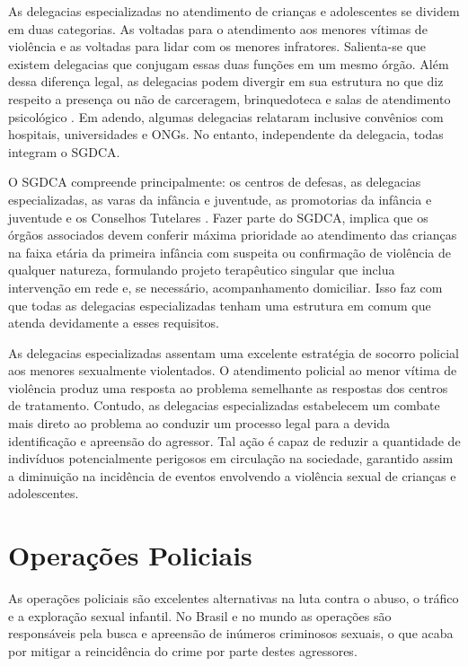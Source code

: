 As delegacias especializadas no atendimento de crianças e adolescentes se dividem em duas categorias. As voltadas para o atendimento aos menores vítimas de violência e as voltadas para lidar com os menores infratores. Salienta-se que existem delegacias que conjugam essas duas funções em um mesmo órgão. Além dessa diferença legal, as delegacias podem divergir em sua estrutura no que diz respeito a presença ou não de carceragem, brinquedoteca e salas de atendimento psicológico \cite{brasil2016estudo}. Em adendo, algumas delegacias relataram inclusive convênios com hospitais, universidades e \acfp{ONG}. No entanto, independente da delegacia, todas integram o \ac{SGDCA}.

O \ac{SGDCA} compreende principalmente: os centros de defesas, as delegacias especializadas, as varas da infância e juventude, as promotorias da infância e juventude e os Conselhos Tutelares \cite{rodrigues2014violencia}. Fazer parte do \ac{SGDCA}, implica que os órgãos associados devem conferir máxima prioridade ao atendimento das crianças na faixa etária da primeira infância com suspeita ou confirmação de violência de qualquer natureza, formulando projeto terapêutico singular que inclua intervenção em rede e, se necessário, acompanhamento domiciliar. Isso faz com que todas as delegacias especializadas tenham uma estrutura em comum que atenda devidamente a esses requisitos. 

As delegacias especializadas assentam uma excelente estratégia de socorro policial aos menores sexualmente violentados. O atendimento policial ao menor vítima de violência produz uma resposta ao problema semelhante as respostas dos centros de tratamento. Contudo, as delegacias especializadas estabelecem um combate mais direto ao problema ao conduzir um processo legal para a devida identificação e apreensão do agressor. Tal ação é capaz de reduzir a quantidade de indivíduos potencialmente perigosos em circulação na sociedade, garantido assim a diminuição na incidência de eventos envolvendo a violência sexual de crianças e adolescentes. 


\section{Operações Policiais}\label{sec:op}

As operações policiais são excelentes alternativas na luta contra o abuso, o tráfico e a exploração sexual infantil. No Brasil e no mundo as operações são responsáveis pela busca e apreensão de inúmeros criminosos sexuais, o que acaba por mitigar a reincidência do crime por parte destes agressores.


